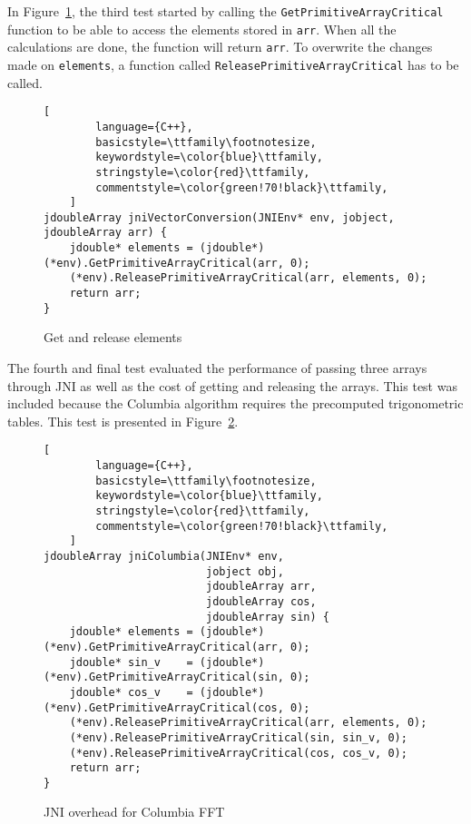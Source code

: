 In Figure~\ref{fig:jni:conversion}, the third test started by calling the \texttt{GetPrimitiveArrayCritical} function to be able to access the elements stored in \texttt{arr}. When all the calculations are done, the function will return \texttt{arr}. To overwrite the changes made on \texttt{elements}, a function called \texttt{ReleasePrimitiveArrayCritical} has to be called.

\begin{figure}
\begin{lstlisting}[
        language={C++},
        basicstyle=\ttfamily\footnotesize,
        keywordstyle=\color{blue}\ttfamily,
        stringstyle=\color{red}\ttfamily,
        commentstyle=\color{green!70!black}\ttfamily,
    ]
jdoubleArray jniVectorConversion(JNIEnv* env, jobject, jdoubleArray arr) {
    jdouble* elements = (jdouble*)(*env).GetPrimitiveArrayCritical(arr, 0);
    (*env).ReleasePrimitiveArrayCritical(arr, elements, 0);
    return arr;
}
\end{lstlisting}
\caption{Get and release elements}
\label{fig:jni:conversion}
\end{figure}

The fourth and final test evaluated the performance of passing three arrays through JNI as well as the cost of getting and releasing the arrays. This test was included because the Columbia algorithm requires the precomputed trigonometric tables. This test is presented in Figure~\ref{fig:jni:columbia}.

\begin{figure}
\begin{lstlisting}[
        language={C++},
        basicstyle=\ttfamily\footnotesize,
        keywordstyle=\color{blue}\ttfamily,
        stringstyle=\color{red}\ttfamily,
        commentstyle=\color{green!70!black}\ttfamily,
    ]
jdoubleArray jniColumbia(JNIEnv* env,
                         jobject obj,
                         jdoubleArray arr,
                         jdoubleArray cos,
                         jdoubleArray sin) {
    jdouble* elements = (jdouble*)(*env).GetPrimitiveArrayCritical(arr, 0);
    jdouble* sin_v    = (jdouble*)(*env).GetPrimitiveArrayCritical(sin, 0);
    jdouble* cos_v    = (jdouble*)(*env).GetPrimitiveArrayCritical(cos, 0);
    (*env).ReleasePrimitiveArrayCritical(arr, elements, 0);
    (*env).ReleasePrimitiveArrayCritical(sin, sin_v, 0);
    (*env).ReleasePrimitiveArrayCritical(cos, cos_v, 0);
    return arr;
}
\end{lstlisting}
\caption{JNI overhead for Columbia FFT}
\label{fig:jni:columbia}
\end{figure}

